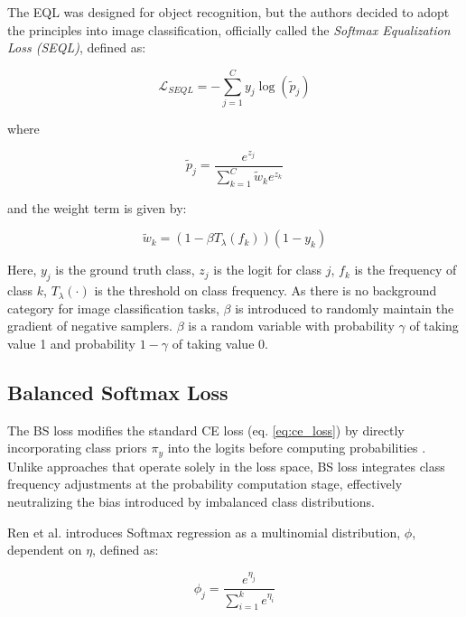 \noindent The EQL was designed for object recognition, but the authors decided to adopt the principles into image classification, officially called the \emph{Softmax Equalization Loss (SEQL)}, defined as: 

\begin{equation}
    \label{eq:EQ_loss}
    \mathcal{L}_{SEQL} = - \sum_{j=1}^{C} y_j \log(\tilde{p}_j)
\end{equation}

\noindent where

\begin{equation}
    \tilde{p}_j = \frac{e^{z_j}}{\sum_{k=1}^{C} \tilde{w}_k e^{z_k}}
\end{equation}

\noindent and the weight term is given by:

\begin{equation}
    \tilde{w}_k = (1 - \beta T_\lambda(f_k))(1 - y_k)
\end{equation}

\noindent Here, $y_j$ is the ground truth class, $z_j$ is the logit for class $j$, $f_k$ is the frequency of class $k$, \(T_\lambda(\cdot)\) is the threshold on class frequency. As there is no background category for image classification tasks, $\beta$ is introduced to randomly maintain the gradient of negative samplers. \(\beta\) is a random variable with probability \(\gamma\) of taking value 1 and probability \(1 - \gamma\) of taking value 0.


\subsection{Balanced Softmax Loss}
\label{sec:bs_loss}
The BS loss modifies the standard CE loss (eq. \eqref{eq:ce_loss}) by directly incorporating class priors $\pi_y$ into the logits before computing probabilities \cite{ren2020balancedmetasoftmaxlongtailedvisual}. Unlike approaches that operate solely in the loss space, BS loss integrates class frequency adjustments at the probability computation stage, effectively neutralizing the bias introduced by imbalanced class distributions. 

Ren et al. \cite{ren2020balancedmetasoftmaxlongtailedvisual} introduces Softmax regression as a multinomial distribution, $\phi$, dependent on $\eta$, defined as:

\begin{equation}
    \phi_j = \frac{e^{\eta_j}}{\sum_{i=1}^{k}e^{\eta_i}}
\end{equation}

